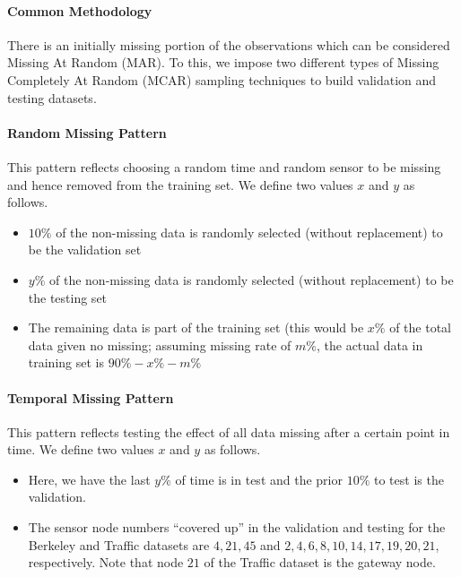 \paragraph*{Common Methodology}

There is an initially missing portion of the observations which can be considered Missing At Random (MAR).
To this, we impose two different types of Missing Completely At Random (MCAR) sampling techniques to build validation and testing datasets.

\paragraph*{Random Missing Pattern}

This pattern reflects choosing a random time and random sensor to be missing and hence removed from the training set.
We define two values $x$ and $y$ as follows.

\begin{itemize}
\item $10\%$ of the non-missing data is randomly selected (without replacement) to be the validation set
\item $y\%$ of the non-missing data is randomly selected (without replacement) to be the testing set
\item The remaining data is part of the training set (this would be $x\%$ of the total data given no missing; assuming missing rate of $m\%$, the actual data in training set is $90\%-x\%-m\%$
\end{itemize}

\paragraph*{Temporal Missing Pattern}

This pattern reflects testing the effect of all data missing after a certain point in time.
We define two values $x$ and $y$ as follows.

\begin{itemize}
\item Here, we have the last $y\%$ of time is in test and the prior $10\%$ to test is the validation.
\item The sensor node numbers ``covered up'' in the validation and testing for the Berkeley and Traffic datasets are ${4,21,45}$ and ${2,4,6,8,10,14,17,19,20,21}$, respectively.
Note that node $21$ of the Traffic dataset is the gateway node.
\end{itemize}

